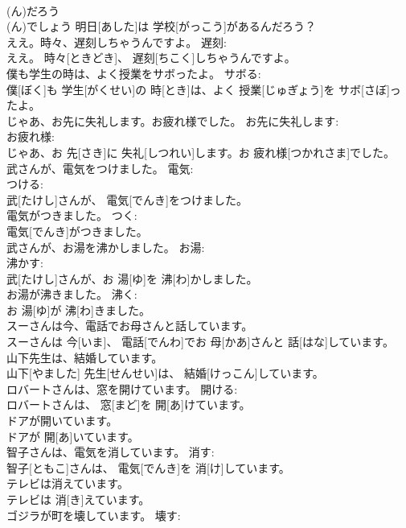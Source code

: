 \documentclass[8pt]{extreport}
\begin{document}
\begin{CJK}{UTF8}{min}
\\	(ん)だろう 
\\	(ん)でしょう	明日[あした]は 学校[がっこう]があるんだろう？	
\\	ええ。時々、遅刻しちゃうんですよ。	遅刻: 
\\	ええ。 時々[ときどき]、 遅刻[ちこく]しちゃうんですよ。	
\\	僕も学生の時は、よく授業をサボったよ。	サボる: 
\\	僕[ぼく]も 学生[がくせい]の 時[とき]は、よく 授業[じゅぎょう]を サボ[さぼ]ったよ。	
\\	じゃあ、お先に失礼します。お疲れ様でした。	お先に失礼します: 
\\	お疲れ様: 
\\	じゃあ、お 先[さき]に 失礼[しつれい]します。お 疲れ様[つかれさま]でした。	
\\	武さんが、電気をつけました。	電気: 
\\	つける: 
\\	武[たけし]さんが、 電気[でんき]をつけました。	
\\	電気がつきました。	つく: 
\\	電気[でんき]がつきました。	
\\	武さんが、お湯を沸かしました。	お湯: 
\\	沸かす: 
\\	武[たけし]さんが、お 湯[ゆ]を 沸[わ]かしました。	
\\	お湯が沸きました。	沸く: 
\\	お 湯[ゆ]が 沸[わ]きました。	
\\	スーさんは今、電話でお母さんと話しています。	
\\	スーさんは 今[いま]、 電話[でんわ]でお 母[かあ]さんと 話[はな]しています。	
\\	山下先生は、結婚しています。	
\\	山下[やました] 先生[せんせい]は、 結婚[けっこん]しています。	
\\	ロバートさんは、窓を開けています。	開ける: 
\\	ロバートさんは、 窓[まど]を 開[あ]けています。	
\\	ドアが開いています。	
\\	ドアが 開[あ]いています。	
\\	智子さんは、電気を消しています。	消す: 
\\	智子[ともこ]さんは、 電気[でんき]を 消[け]しています。	
\\	テレビは消えています。	
\\	テレビは 消[き]えています。	
\\	ゴジラが町を壊しています。	壊す: 

\end{CJK}
\end{document}
